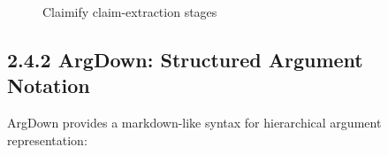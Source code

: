 \documentclass[
  11pt,
  letterpaper,
]{book}
\begin{document}
\begin{figure}


\caption[Claimify claim-extraction
stages]{\label{fig-claimify-stages}Claimify claim-extraction stages}

\end{figure}%

\textcite{anderson2007}

\textcite{benn2011}

\textcite{khartabil2021}

\textcite{khartabil2020}

\textcite{ngajie2020}

\textcite{prokudin2024}

\textcite{scheuer2010}

\textcite{thomas1962}

\textcite{walton2009}

\subsection*{2.4.2 ArgDown: Structured Argument
Notation}\label{sec-argdown-notation}

\textcite{voigt2025}

ArgDown provides a markdown-like syntax for hierarchical argument
representation:
\end{document}
